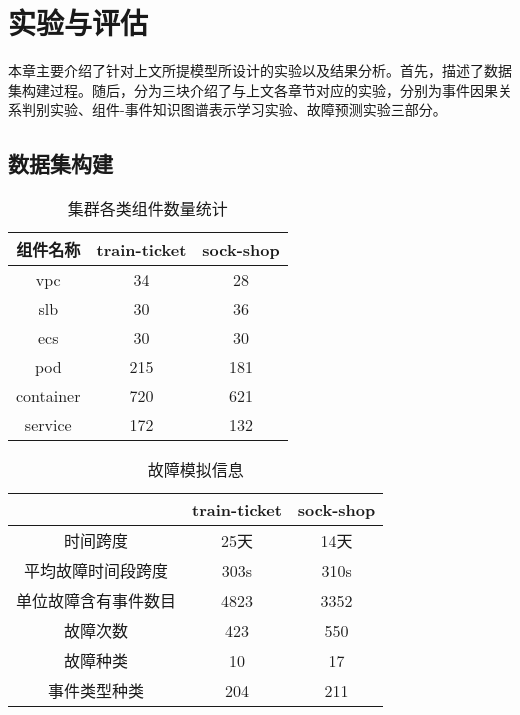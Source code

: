 \chapter{实验与评估}
本章主要介绍了针对上文所提模型所设计的实验以及结果分析。首先，描述了数据集构建过程。随后，分为三块介绍了与上文各章节对应的实验，分别为事件因果关系判别实验、组件-事件知识图谱表示学习实验、故障预测实验三部分。

\section{数据集构建}
\begin{table}[htbp]
    \caption{集群各类组件数量统计}
    \label{component-num}
    \centering
    \begin{tabular}{ccc}
    \hline
    组件名称      & train-ticket & sock-shop        \\ \hline
    vpc       & 34           & 28 \\
    slb       & 30           & 36 \\
    ecs       & 30           & 30 \\
    pod       & 215          & 181 \\
    container & 720          & 621 \\
    service   & 172          & 132 \\ \hline
    \end{tabular}
\end{table}

\begin{table}[htbp]
    \caption{故障模拟信息}
    \centering
    \label{failure-simulation-info}
    \begin{tabular}{ccc}
    \hline
               & train-ticket & \multicolumn{1}{c}{sock-shop} \\ \hline
    时间跨度       & 25天          & 14天                           \\
    平均故障时间段跨度  & 303s         & 310s                          \\
    单位故障含有事件数目 & 4823         & 3352                          \\
    故障次数       & 423          & 550                           \\
    故障种类       & 10           & 17                            \\
    事件类型种类     & 204          & 211                           \\ \hline
    \end{tabular}
\end{table}

